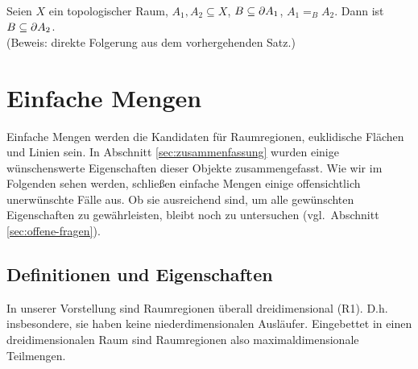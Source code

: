     \begin{kor}\ \\ 
        Seien $X$ ein topologischer Raum, $A_1, A_2 \subseteq X$, $B \subseteq \partial A_1$, $A_1 =_{B} A_2$. Dann ist $B \subseteq \partial A_2$.\\
        (Beweis: direkte Folgerung aus dem vorhergehenden Satz.)
    \end{kor}


    
    

\section{Einfache Mengen}\label{sec:einf-mengen}
% 
% 

Einfache Mengen werden die Kandidaten für Raumregionen, euklidische Flächen und Linien sein.
In Abschnitt \ref{sec:zusammenfassung} wurden einige wünschenswerte Eigenschaften dieser Objekte zusammengefasst.
Wie wir im Folgenden sehen werden, schließen einfache Mengen einige offensichtlich unerwünschte Fälle aus. 
Ob sie ausreichend sind, um alle gewünschten Eigenschaften zu gewährleisten, bleibt noch zu untersuchen (vgl.\ Abschnitt \ref{sec:offene-fragen}).


\subsection{Definitionen und Eigenschaften}
In
unserer Vorstellung sind Raumregionen überall dreidimensional (R1). D.h. insbesondere, sie haben keine \glqq niederdimensionalen Ausläufer\grqq.
Eingebettet in einen dreidimensionalen Raum sind Raumregionen also maximaldimensionale Teilmengen.

